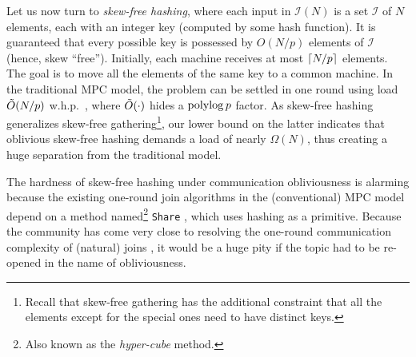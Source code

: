 \documentclass[sigconf]{acmart}
\def\vgap{\vspace{0mm}}
\def\extraspacing{\vspace{1mm} \noindent}
\def\I{\mathcal{I}}
\def\II{\mathscr{I}}
\begin{document}
\vgap

Let us now turn to {\em skew-free hashing}, where each input in $\II(N)$ is a set $\I$ of $N$ elements, each with an integer key (computed by some hash function). It is guaranteed that every possible key is possessed by $O(N/p)$ elements of $\I$ (hence, skew ``free''). Initially, each machine receives at most $\lceil N/p \rceil$ elements. The goal is to move all the elements of the same key to a common machine. In the traditional MPC model, the problem can be settled in one round using load $\tilde{O}(N/p)$ w.h.p.\ \cite{bks14,bks17c}, where $\tilde{O}(\cdot)$ hides a $\operatorname*{polylog} p$ factor. As skew-free hashing generalizes skew-free gathering\footnote{Recall that skew-free gathering has the additional constraint that all the elements except for the special ones need to have distinct keys.}, our lower bound on the latter indicates that oblivious skew-free hashing demands a load of nearly $\Omega(N)$, thus creating a huge separation from the traditional model. 


\extraspacing {\bf Single-Round Joins.} The hardness of skew-free hashing under communication obliviousness is alarming because the existing one-round join algorithms \cite{assu13,au11,bks13,bks14,bks17c,kbs16} in the (conventional) MPC model depend on a method named\footnote{Also known as the {\em hyper-cube} method.} \texttt{Share} \cite{au11,bks17c}, which uses hashing as a primitive. Because the community has come very close to resolving the one-round communication complexity of (natural) joins \cite{kbs16}, it would be a huge pity if the topic had to be re-opened in the name of obliviousness.

\vgap
\end{document}
